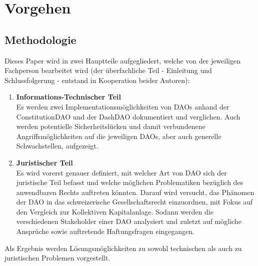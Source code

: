 \documentclass[a4paper,12pt]{report}
\begin{document}
	
	\chapter{Vorgehen}
	
	\vspace*{-0.25em}\section{Methodologie}\vspace*{-0.5em}
	\startsection
	    Dieses Paper wird in zwei Hauptteile aufgegliedert, welche von der jeweiligen Fachperson bearbeitet wird (der überfachliche Teil - Einleitung und Schlussfolgerung - entstand in Kooperation beider Autoren):
	    \begin{enumerate}
	        \item \textbf{Informations-Technischer Teil} \\
	        Es werden zwei Implementationsmöglichkeiten von DAOs anhand der ConstitutionDAO und der DashDAO dokumentiert und verglichen. Auch werden potentielle Sicherheitslücken und damit verbundenene Angriffsmöglichkeiten auf die jeweiligen DAOs, aber auch generelle Schwachstellen, aufgezeigt.
	        \item \textbf{Juristischer Teil} \\
	        Es wird vorerst genauer definiert, mit welcher Art von DAO sich der juristische Teil befasst und welche möglichen Problematiken bezüglich des anwendbaren Rechts auftreten könnten. Darauf wird versucht, das Phänomen der DAO in das schweizerische Gesellschaftsrecht einzuordnen, mit Fokus auf den Vergleich zur Kollektiven Kapitalanlage. Sodann werden die verschiedenen Stakeholder einer DAO analysiert und zuletzt auf mögliche Ansprüche sowie auftretende Haftungsfragen eingegangen.
	    \end{enumerate}
	    Als Ergebnis werden Lösungsmöglichkeiten zu sowohl technischen als auch zu juristischen Problemen vorgestellt.
	\closesection
	
\end{document}
